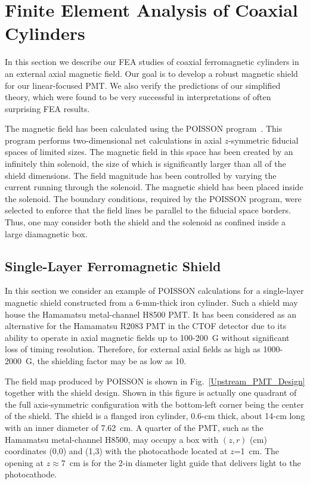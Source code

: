 \documentclass[12pt]{article}
\begin{document}
\section{Finite Element Analysis of Coaxial Cylinders}
\label{sec:fea}

In this section we describe our FEA studies of coaxial ferromagnetic cylinders
in an external axial magnetic field. Our goal is to develop a robust magnetic 
shield for our linear-focused PMT. We also verify the predictions of our 
simplified theory, which were found to be very successful in interpretations of 
often surprising FEA results.

The magnetic field has been calculated using the POISSON program~\cite{poisson}. 
This program performs two-dimensional net calculations in axial $z$-symmetric 
fiducial spaces of limited sizes. The magnetic field in this space has been 
created by an infinitely thin solenoid, the size of which is significantly larger 
than all of the shield dimensions. The field magnitude has been controlled by
varying the current running through the solenoid. The magnetic shield has been 
placed inside the solenoid. The boundary conditions, required by the POISSON 
program, were selected to enforce that the field lines be parallel to the 
fiducial space borders. Thus, one may consider both the shield and the 
solenoid as confined inside a large diamagnetic box.

\subsection{Single-Layer Ferromagnetic Shield}
\label{emsdimen}

In this section we consider an example of POISSON calculations for a 
single-layer magnetic shield constructed from a 6-mm-thick iron cylinder. Such 
a shield may house the Hamamatsu metal-channel H8500 PMT. It has been considered 
as an alternative for the Hamamatsu R2083 PMT in the CTOF detector due to its 
ability to operate in axial magnetic fields up to 100-200~G without significant 
loss of timing resolution. Therefore, for external axial fields as high as 
1000-2000~G, the shielding factor may be as low as 10. 

The field map produced by POISSON is shown in Fig.~\ref{Upstream_PMT_Design} 
together with the shield design. Shown in this figure is actually one quadrant 
of the full axis-symmetric configuration with the bottom-left corner being the 
center of the shield. The shield is a flanged iron cylinder, 0.6-cm thick, about 
14-cm long with an inner diameter of 7.62~cm. A quarter of the PMT, such as the 
Hamamatsu metal-channel H8500, may occupy a box with $(z,r)$ (cm) coordinates 
(0,0) and (1,3) with the photocathode located at $z$=1~cm. The opening at
$z$$\approx$7~cm is for the 2-in diameter light guide that delivers light to the 
photocathode.
\end{document}

